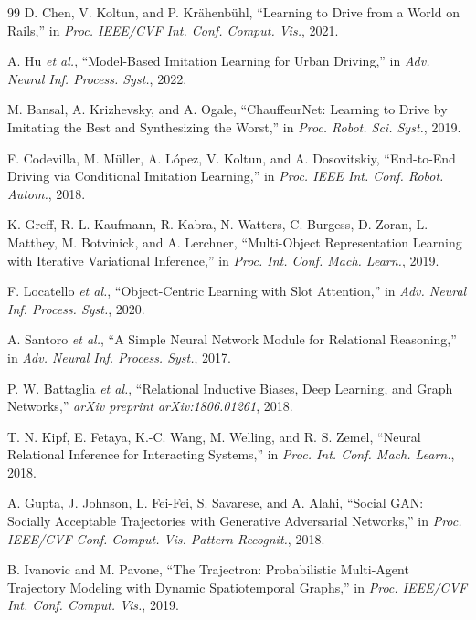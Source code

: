 \documentclass[10pt,journal,compsoc]{IEEEtran}
\begin{document}
\begin{thebibliography}{99}
D. Chen, V. Koltun, and P. Kr{\"a}henb{\"u}hl, ``Learning to Drive from a World on Rails,'' in \emph{Proc. IEEE/CVF Int. Conf. Comput. Vis.}, 2021.

A. Hu \emph{et al.}, ``Model-Based Imitation Learning for Urban Driving,'' in \emph{Adv. Neural Inf. Process. Syst.}, 2022.

M. Bansal, A. Krizhevsky, and A. Ogale, ``ChauffeurNet: Learning to Drive by Imitating the Best and Synthesizing the Worst,'' in \emph{Proc. Robot. Sci. Syst.}, 2019.

F. Codevilla, M. M{\"u}ller, A. L{\'o}pez, V. Koltun, and A. Dosovitskiy, ``End-to-End Driving via Conditional Imitation Learning,'' in \emph{Proc. IEEE Int. Conf. Robot. Autom.}, 2018.

K. Greff, R. L. Kaufmann, R. Kabra, N. Watters, C. Burgess, D. Zoran, L. Matthey, M. Botvinick, and A. Lerchner, ``Multi-Object Representation Learning with Iterative Variational Inference,'' in \emph{Proc. Int. Conf. Mach. Learn.}, 2019.

F. Locatello \emph{et al.}, ``Object-Centric Learning with Slot Attention,'' in \emph{Adv. Neural Inf. Process. Syst.}, 2020.

A. Santoro \emph{et al.}, ``A Simple Neural Network Module for Relational Reasoning,'' in \emph{Adv. Neural Inf. Process. Syst.}, 2017.

P. W. Battaglia \emph{et al.}, ``Relational Inductive Biases, Deep Learning, and Graph Networks,'' \emph{arXiv preprint arXiv:1806.01261}, 2018.

T. N. Kipf, E. Fetaya, K.-C. Wang, M. Welling, and R. S. Zemel, ``Neural Relational Inference for Interacting Systems,'' in \emph{Proc. Int. Conf. Mach. Learn.}, 2018.

A. Gupta, J. Johnson, L. Fei-Fei, S. Savarese, and A. Alahi, ``Social GAN: Socially Acceptable Trajectories with Generative Adversarial Networks,'' in \emph{Proc. IEEE/CVF Conf. Comput. Vis. Pattern Recognit.}, 2018.

B. Ivanovic and M. Pavone, ``The Trajectron: Probabilistic Multi-Agent Trajectory Modeling with Dynamic Spatiotemporal Graphs,'' in \emph{Proc. IEEE/CVF Int. Conf. Comput. Vis.}, 2019.


\end{thebibliography}
\end{document}
